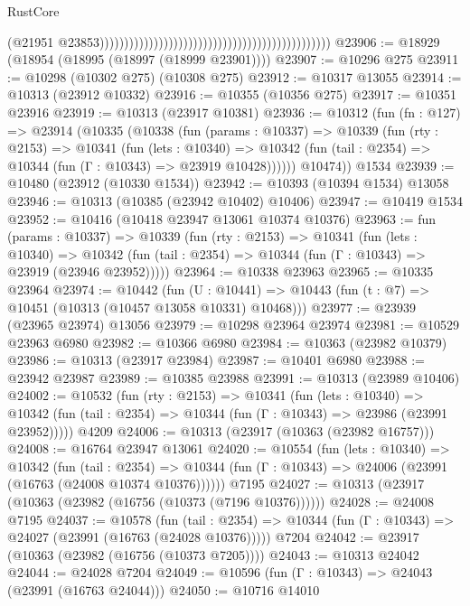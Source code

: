 \begin{lexlean}{RustCore}
\begin{coremodule}
                                                                                                (@21951
                                                                                                  @23853)))))))))))))))))))))))))))))))))))))))))))))))
@23906 := @18929 (@18954 (@18995 (@18997 (@18999 @23901))))
@23907 := @10296 @275
@23911 := @10298 (@10302 @275) (@10308 @275)
@23912 := @10317 @13055
@23914 := @10313 (@23912 @10332)
@23916 := @10355 (@10356 @275)
@23917 := @10351 @23916
@23919 := @10313 (@23917 @10381)
@23936 := @10312
    (fun (fn : @127) =>
    @23914
      (@10335
        (@10338
          (fun (params : @10337) =>
          @10339
            (fun (rty : @2153) =>
            @10341
              (fun (lets : @10340) =>
              @10342 (fun (tail : @2354) => @10344 (fun (Γ : @10343) => @23919 @10428))))))
        @10474))
    @1534
@23939 := @10480 (@23912 (@10330 @1534))
@23942 := @10393 (@10394 @1534) @13058
@23946 := @10313 (@10385 (@23942 @10402) @10406)
@23947 := @10419 @1534
@23952 := @10416 (@10418 @23947 @13061 @10374 @10376)
@23963 := fun (params : @10337) =>
  @10339
    (fun (rty : @2153) =>
    @10341
      (fun (lets : @10340) =>
      @10342 (fun (tail : @2354) => @10344 (fun (Γ : @10343) => @23919 (@23946 @23952)))))
@23964 := @10338 @23963
@23965 := @10335 @23964
@23974 := @10442
    (fun (U : @10441) => @10443 (fun (t : @7) => @10451 (@10313 (@10457 @13058 @10331) @10468)))
@23977 := @23939 (@23965 @23974) @13056
@23979 := @10298 @23964 @23974
@23981 := @10529 @23963 @6980
@23982 := @10366 @6980
@23984 := @10363 (@23982 @10379)
@23986 := @10313 (@23917 @23984)
@23987 := @10401 @6980
@23988 := @23942 @23987
@23989 := @10385 @23988
@23991 := @10313 (@23989 @10406)
@24002 := @10532
    (fun (rty : @2153) =>
    @10341
      (fun (lets : @10340) =>
      @10342 (fun (tail : @2354) => @10344 (fun (Γ : @10343) => @23986 (@23991 @23952)))))
    @4209
@24006 := @10313 (@23917 (@10363 (@23982 @16757)))
@24008 := @16764 @23947 @13061
@24020 := @10554
    (fun (lets : @10340) =>
    @10342
      (fun (tail : @2354) =>
      @10344 (fun (Γ : @10343) => @24006 (@23991 (@16763 (@24008 @10374 @10376))))))
    @7195
@24027 := @10313 (@23917 (@10363 (@23982 (@16756 (@10373 (@7196 @10376))))))
@24028 := @24008 @7195
@24037 := @10578
    (fun (tail : @2354) => @10344 (fun (Γ : @10343) => @24027 (@23991 (@16763 (@24028 @10376)))))
    @7204
@24042 := @23917 (@10363 (@23982 (@16756 (@10373 @7205))))
@24043 := @10313 @24042
@24044 := @24028 @7204
@24049 := @10596 (fun (Γ : @10343) => @24043 (@23991 (@16763 @24044)))
@24050 := @10716 @14010

\end{coremodule}
\end{lexlean}
